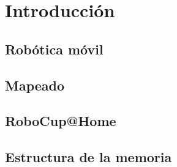 \chapter{Introducción}
\label{cap:introduccion}

\section{Robótica móvil}
\label{cap:roboticamovil}

\section{Mapeado}
\label{cap:mapeado}

\section{RoboCup@Home}
\label{cap:robocup}

\section{Estructura de la memoria}
\label{cap:estructuradelamemoria}


